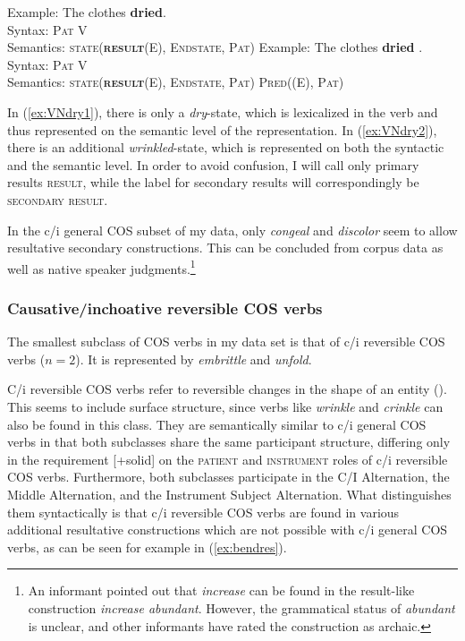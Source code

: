 \begin{exe}
  \ex \label{ex:VNdry}
  \label{ex:VNdry1} Example: The clothes \textbf{dried}. \\ Syntax: \textsc{Pat V} \\ Semantics: \textsc{state(\textbf{result}(E), Endstate, Pat)}
  \ex \label{ex:VNdry2} Example: The clothes \textbf{dried} . \\ Syntax: \textsc{Pat} V \textsc{} \\ Semantics: \textsc{state(\textbf{result}(E), Endstate, Pat) Pred((E), Pat)}
\end{exe}

\noindent In (\ref{ex:VNdry1}), there is only a \textit{dry}-state, which is lexicalized in the verb and thus represented on the semantic level of the representation. 
In (\ref{ex:VNdry2}), there is an additional \textit{wrinkled}-state, which is represented on both the syntactic and the semantic level.
In order to avoid confusion, I will call only primary results \textsc{result}, while the label for secondary results will correspondingly be \textsc{secondary result}.

In the c/i general COS subset of my data, only \textit{congeal} and \textit{discolor} seem to allow resultative secondary constructions. This can be concluded from corpus data as well as native speaker judgments.\footnote{An informant pointed out that \textit{increase} can be found in the result-like construction \textit{increase abundant}. However, the grammatical status of \textit{abundant} is unclear, and other informants have rated the construction as archaic.} 

\subsubsection{{Causative/inchoative reversible COS verbs}}
\label{sec:cos-VN-c/irevers}

The smallest subclass of COS verbs in my data set is that of c/i reversible COS verbs ($n=2$). It is represented by \textit{embrittle} and \textit{unfold}.

C/i reversible COS verbs refer to reversible changes in the shape of an entity (\citealt[243]{Levin.1993}). This seems to include surface structure, since verbs like \textit{wrinkle} and \textit{crinkle} can also be found in this class.
They are semantically similar to c/i general COS verbs in that both subclasses share the same participant structure, differing only in the requirement [+solid] on the \textsc{patient} and \textsc{instrument} roles of c/i reversible COS verbs. 
Furthermore, both subclasses participate in the C/I Alternation, the Middle Alternation, and the Instrument Subject Alternation. What distinguishes them syntactically is that c/i reversible COS verbs are found in various additional resultative constructions which are not possible with c/i general COS verbs, as can be seen for example in (\ref{ex:bendres}). 

